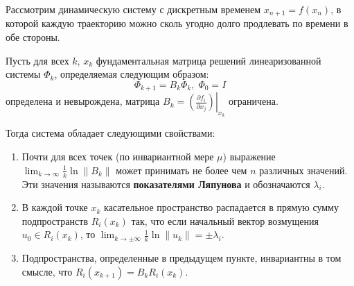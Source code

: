 
Рассмотрим динамическую систему с дискретным временем $x_{n+1} = f(x_n)$, в которой каждую траекторию можно сколь угодно долго продлевать по времени в обе стороны.

\begin{theorem}
    Пусть для всех $k$, $x_k$ фундаментальная матрица решений линеаризованной системы $\Phi_k$, определяемая следующим образом:
    \begin{equation*}
        \Phi_{k+1} = B_k \Phi_k,\; \Phi_0 = I
    \end{equation*}
    определена и невырождена, матрица $B_k = \left.\left(\frac{\partial f_i}{\partial x_j} \right)\right|_{x_k}$ ограничена.
    
    Тогда система обладает следующими свойствами:
    \begin{enumerate}
    \item
        Почти для всех точек (по инвариантной мере $\mu$) выражение $\lim_{k \to \infty} \frac{1}{k} \ln \| B_k \|$ может принимать не более чем $n$ различных значений. Эти значения называются \textbf{показателями Ляпунова} и обозначаются $\lambda_i$.
    \item
        В каждой точке $x_k$ касательное пространство распадается в прямую сумму подпространств $R_i(x_k)$ так, что если начальный вектор возмущения $u_0 \in R_i(x_k)$, то $\lim_{k \to \pm\infty} \frac{1}{k} \ln \| u_k \| = \pm\lambda_i$.
    \item
        Подпространства, определенные в предыдущем пункте, инвариантны в том смысле, что $R_i\left( x_{k+1} \right) = B_k R_i\left( x_k \right)$.
    \end{enumerate}
\end{theorem}

